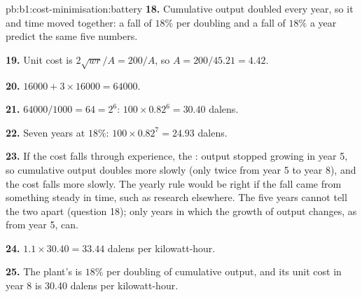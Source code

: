 \begin{solution}{pb:b1:cost-minimisation:battery}
\textbf{18.} Cumulative output doubled every year, so it and time moved
together: a fall of $18\%$ per doubling and a fall of $18\%$ a year predict the
same five numbers.

\textbf{19.} Unit cost is $2\sqrt{wr}/A = 200/A$, so $A = 200/45.21 = 4.42$.

\textbf{20.} $16000 + 3 \times 16000 = 64000$.

\textbf{21.} $64000/1000 = 64 = 2^6$: $100 \times 0.82^6 = 30.40$ dalens.

\textbf{22.} Seven years at $18\%$: $100 \times 0.82^7 = 24.93$ dalens.

\textbf{23.} If the cost falls through experience, the : output
stopped growing in year 5, so cumulative output doubles more slowly (only
twice from year 5 to year 8), and the cost falls more slowly. The yearly
rule would be right if the fall came from something steady in time, such
as research elsewhere. The five years cannot tell the two apart
(question 18); only years in which the growth of output changes, as from
year 5, can.

\textbf{24.} $1.1 \times 30.40 = 33.44$ dalens per kilowatt-hour.

\textbf{25.} The plant's  is $18\%$ per doubling of cumulative
output, and its unit cost in year 8 is 30.40 dalens per kilowatt-hour.
\end{solution}
